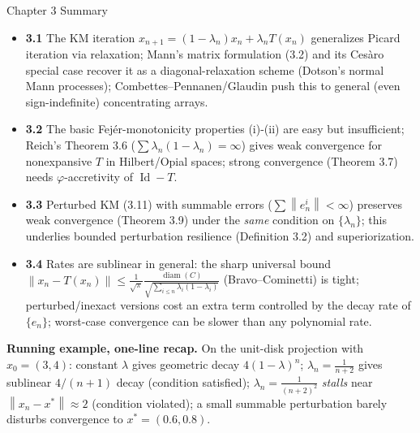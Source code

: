 \documentclass[aspectratio=169,10pt]{beamer}
\newcommand{\norm}[1]{\left\|#1\right\|}
\begin{document}
\begin{frame}[allowframebreaks]{Chapter 3 Summary}

  \begin{itemize}
    \item \textbf{3.1} The KM iteration
      $x_{n+1}=(1-\lambda_n)x_n+\lambda_nT(x_n)$ generalizes Picard
      iteration via relaxation; Mann's matrix formulation (3.2) and its
      Ces\`aro special case recover it as a diagonal-relaxation scheme
      (Dotson's normal Mann processes); Combettes--Pennanen/Glaudin push
      this to general (even sign-indefinite) concentrating arrays.
    \item \textbf{3.2} The basic Fej\'er-monotonicity properties (i)-(ii)
      are easy but insufficient; Reich's Theorem 3.6
      ($\sum\lambda_n(1-\lambda_n)=\infty$) gives weak convergence for
      nonexpansive $T$ in Hilbert/Opial spaces; strong convergence
      (Theorem 3.7) needs $\varphi$-accretivity of $\operatorname{Id}-T$.
    \item \textbf{3.3} Perturbed KM (3.11) with summable errors
      ($\sum\norm{e_n^i}<\infty$) preserves weak convergence
      (Theorem 3.9) under the \emph{same} condition on $\{\lambda_n\}$;
      this underlies bounded perturbation resilience (Definition 3.2)
      and superiorization.
    \item \textbf{3.4} Rates are sublinear in general: the sharp
      universal bound $\norm{x_n-T(x_n)}\le\frac{1}{\sqrt\pi}
      \frac{\operatorname{diam}(C)}{\sqrt{\sum_{i\le n}\lambda_i(1-\lambda_i)}}$
      (Bravo--Cominetti) is tight; perturbed/inexact versions cost an
      extra term controlled by the decay rate of $\{e_n\}$; worst-case
      convergence can be slower than any polynomial rate.
  \end{itemize}

  \textbf{Running example, one-line recap.} On the unit-disk projection
  with $x_0=(3,4)$: constant $\lambda$ gives geometric decay $4(1-\lambda)^n$;
  $\lambda_n=\tfrac1{n+2}$ gives sublinear $4/(n+1)$ decay (condition
  satisfied); $\lambda_n=\tfrac1{(n+2)^2}$ \emph{stalls} near
  $\norm{x_n-x^*}\approx2$ (condition violated); a small summable
  perturbation barely disturbs convergence to $x^*=(0.6,0.8)$.
\end{frame}
\end{document}
